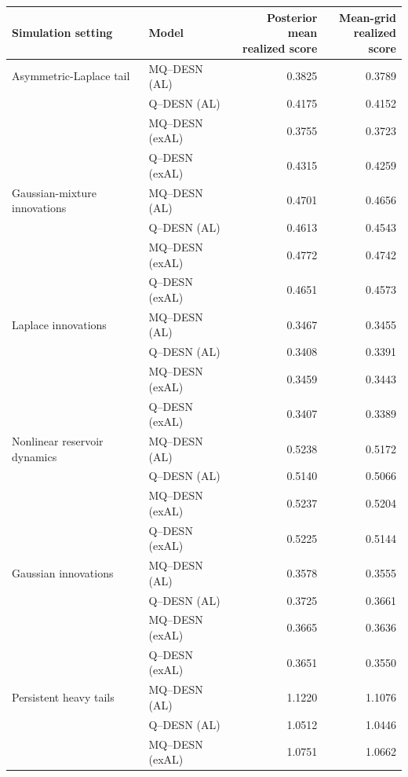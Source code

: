 \begin{table}[p]
\centering
\footnotesize
\setlength{\tabcolsep}{3pt}
\renewcommand{\arraystretch}{1.08}
\begin{tabular}{@{}>{\raggedright\arraybackslash}p{}>{\raggedright\arraybackslash}p{}rr@{}}
\toprule
Simulation setting & Model & \shortstack{Posterior mean\\realized score} & \shortstack{Mean-grid\\realized score} \\
\midrule
Asymmetric-Laplace tail & MQ--DESN (AL) & 0.3825 & 0.3789 \\
 & Q--DESN (AL) & 0.4175 & 0.4152 \\
 & MQ--DESN (exAL) & 0.3755 & 0.3723 \\
 & Q--DESN (exAL) & 0.4315 & 0.4259 \\
\addlinespace[2pt]
Gaussian-mixture innovations & MQ--DESN (AL) & 0.4701 & 0.4656 \\
 & Q--DESN (AL) & 0.4613 & 0.4543 \\
 & MQ--DESN (exAL) & 0.4772 & 0.4742 \\
 & Q--DESN (exAL) & 0.4651 & 0.4573 \\
\addlinespace[2pt]
Laplace innovations & MQ--DESN (AL) & 0.3467 & 0.3455 \\
 & Q--DESN (AL) & 0.3408 & 0.3391 \\
 & MQ--DESN (exAL) & 0.3459 & 0.3443 \\
 & Q--DESN (exAL) & 0.3407 & 0.3389 \\
\addlinespace[2pt]
Nonlinear reservoir dynamics & MQ--DESN (AL) & 0.5238 & 0.5172 \\
 & Q--DESN (AL) & 0.5140 & 0.5066 \\
 & MQ--DESN (exAL) & 0.5237 & 0.5204 \\
 & Q--DESN (exAL) & 0.5225 & 0.5144 \\
\addlinespace[2pt]
Gaussian innovations & MQ--DESN (AL) & 0.3578 & 0.3555 \\
 & Q--DESN (AL) & 0.3725 & 0.3661 \\
 & MQ--DESN (exAL) & 0.3665 & 0.3636 \\
 & Q--DESN (exAL) & 0.3651 & 0.3550 \\
\addlinespace[2pt]
Persistent heavy tails & MQ--DESN (AL) & 1.1220 & 1.1076 \\
 & Q--DESN (AL) & 1.0512 & 1.0446 \\
 & MQ--DESN (exAL) & 1.0751 & 1.0662 \\

\end{tabular}
\end{table}
